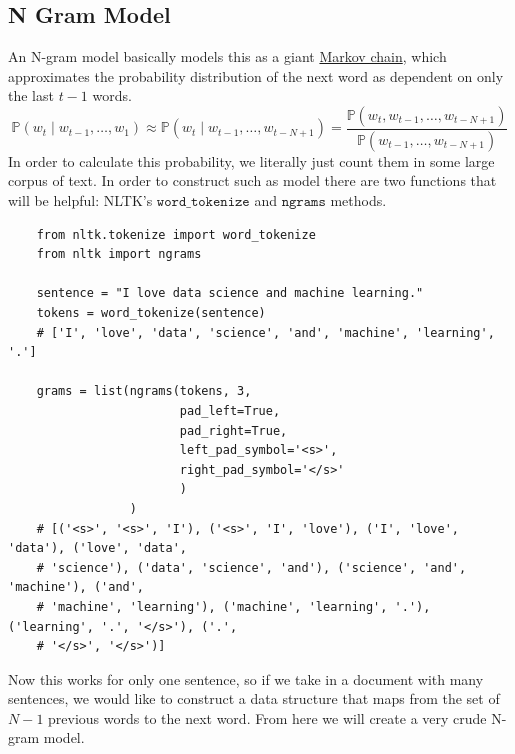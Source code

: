 \documentclass{article}
\begin{document}
  \subsection{N Gram Model}

    An N-gram model basically models this as a giant \hyperref[sp-def:markov-chain]{Markov chain}, which approximates the probability distribution of the next word as dependent on only the last $t-1$ words.
    \begin{equation}
      \mathbb{P}(w_t \mid w_{t-1}, \ldots, w_{1}) \approx \mathbb{P}( w_t \mid w_{t-1}, \ldots, w_{t - N + 1}) = \frac{\mathbb{P}(w_t, w_{t-1}, \ldots, w_{t-N+1})}{\mathbb{P}(w_{t-1}, \ldots, w_{t-N+1})}
    \end{equation}
    In order to calculate this probability, we literally just count them in some large corpus of text. 
    In order to construct such as model there are two functions that will be helpful: NLTK's $\texttt{word\_tokenize}$ and $\texttt{ngrams}$ methods. 
    \begin{lstlisting}
    from nltk.tokenize import word_tokenize 
    from nltk import ngrams 

    sentence = "I love data science and machine learning."
    tokens = word_tokenize(sentence) 
    # ['I', 'love', 'data', 'science', 'and', 'machine', 'learning', '.']

    grams = list(ngrams(tokens, 3, 
                        pad_left=True, 
                        pad_right=True, 
                        left_pad_symbol='<s>', 
                        right_pad_symbol='</s>'
                        ) 
                 )
    # [('<s>', '<s>', 'I'), ('<s>', 'I', 'love'), ('I', 'love', 'data'), ('love', 'data', 
    # 'science'), ('data', 'science', 'and'), ('science', 'and', 'machine'), ('and', 
    # 'machine', 'learning'), ('machine', 'learning', '.'), ('learning', '.', '</s>'), ('.', 
    # '</s>', '</s>')]
    \end{lstlisting}
    Now this works for only one sentence, so if we take in a document with many sentences, we would like to construct a data structure that maps from the set of $N-1$ previous words to the next word. From here we will create a very crude N-gram model. 
\end{document}
